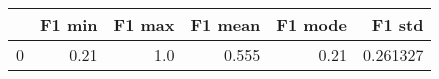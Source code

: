 \begin{tabular}{lrrrrr}
\toprule
{} &  F1 min &  F1 max &  F1 mean &  F1 mode &    F1 std \\
\midrule
0 &    0.21 &     1.0 &    0.555 &     0.21 &  0.261327 \\
\bottomrule
\end{tabular}
